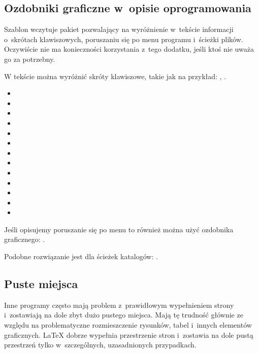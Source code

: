 \subsection{Ozdobniki graficzne w~opisie oprogramowania}
Szablon wczytuje pakiet pozwalający na wyróżnienie w~tekście informacji o~skrótach klawiszowych, poruszaniu się po menu programu i~ścieżki plików. Oczywiście nie ma konieczności korzystania z~tego dodatku, jeśli ktoś nie uważa go za potrzebny.

W tekście można wyróżnić skróty klawiszowe, takie jak na przykład: , \keys{\ctrl, \Alt, \del}.
\begin{itemize}
    \item {}
    \item \keys{\Space} \keys{\SPACE}
    \item \keys{\backspace} \keys{\del} \keys{\backdel}
    \item \keys{\return} \keys{\enter}
    \item \keys{\shift} \keys{\capslock}
    \item \keys{\ctrl} \keys{\Alt} \keys{\AltGr}
    \item \keys{\tab}
    \item \keys{\esc} \keys{\oldesc}
    \item \keys{\winmenu}
    \item \keys{\arrowkey{^}} \keys{\arrowkeyup}
    \item {} \keys{\arrowkeydown}
    \item \keys{\arrowkey{>}} \keys{\arrowkeyright}
    \item \keys{\arrowkey{<}} \keys{\arrowkeyleft}
\end{itemize}

Jeśli opisujemy poruszanie się po menu to również można użyć ozdobnika graficznego: .

Podobne rozwiązanie jest dla ścieżek katalogów: .

\subsection{Puste miejsca}
Inne programy często mają problem z~prawidłowym wypełnieniem strony i~zostawiają na dole zbyt dużo pustego miejsca. Mają tę trudność głównie ze względu na problematyczne rozmieszczenie rysunków, tabel i~innych elementów graficznych. \LaTeX{} dobrze wypełnia przestrzenie stron i~zostawia na dole pustą przestrzeń tylko w~szczególnych, uzasadnionych przypadkach.

